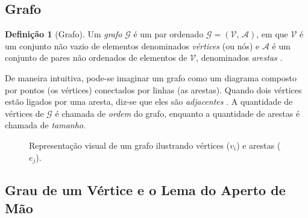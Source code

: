 \documentclass[
  12pt,
  oneside,
  a4paper,
  english,
  brazilian
  ]{abntex2}
\theoremstyle{definition}
\newtheorem{definicao}{Definição}[chapter]
\begin{document}
\subsection{Grafo}

\begin{definicao}[Grafo]
\label{def:grafo}
  Um \textit{grafo} $\mathcal{G}$ é um par ordenado
  $\mathcal{G} = (\mathcal{V},\, \mathcal{A})$, em que $\mathcal{V}$ é um
  conjunto não vazio de elementos denominados \textit{vértices} (ou nós) e
  $\mathcal{A}$ é um conjunto de pares não ordenados de elementos de
  $\mathcal{V}$, denominados \textit{arestas} \cite{boaventura2009}.
\end{definicao}

De maneira intuitiva, pode-se imaginar um grafo como um diagrama composto por
pontos (os vértices) conectados por linhas (as arestas). Quando dois vértices
estão ligados por uma aresta, diz-se que eles são \textit{adjacentes}
\cite{rosen2012}. A quantidade de vértices de $\mathcal{G}$ é chamada de
\textit{ordem} do grafo, enquanto a quantidade de arestas é chamada de
\textit{tamanho}.

\begin{figure}[H]
    \centering
    \caption{Representação visual de um grafo ilustrando vértices ($v_i$) e arestas ($e_j$).}
    \label{fig:representacao_grafo_def}
\end{figure}

\subsection{Grau de um Vértice e o Lema do Aperto de Mão}
\end{document}
